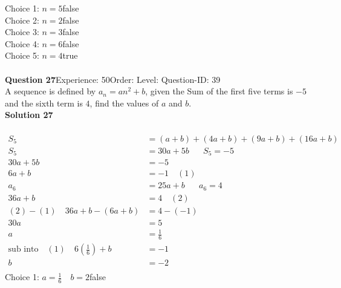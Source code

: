 \documentclass{article}
\begin{document}
Choice 1: \hspace{20pt}$n=5$\hspace{20pt}false\\
Choice 2: \hspace{20pt}$n=2$\hspace{20pt}false\\
Choice 3: \hspace{20pt}$n=3$\hspace{20pt}false\\
Choice 4: \hspace{20pt}$n=6$\hspace{20pt}false\\
Choice 5: \hspace{20pt}$n=4$\hspace{20pt}true\\
\\[4pt]
\noindent\textbf{Question 27}\hspace{20pt}Experience: 50\hspace{20pt}Order: \hspace{20pt}Level: \hspace{20pt}Question-ID: 39\\[2pt]
A sequence is defined by $a_n=an^2+b$, given the Sum of the first five terms is $-5$ and the sixth term is $4$, find the values of $a$ and $b$.\\[4pt]
\noindent\textbf{Solution 27}\\[2pt]
\\[-35pt]\begin{align*}
S_5&=(a+b)+(4a+b)+(9a+b)+(16a+b)\\[2pt]
S_5&=30a+5b\hspace{20pt} S_5=-5\\[2pt]
30a+5b&=-5\\[2pt]
6a+b&=-1\quad (1)\\[12pt]
a_6&=25a+b\hspace{20pt}a_6=4\\[2pt]
36a+b&=4\quad (2)\\[12pt]
(2)-(1)\quad 36a+b-(6a+b)&=4-(-1)\\[2pt]
30a&=5\\[2pt]
a&=\displaystyle\frac{1}{6}\\[12pt]
\text{sub into}\quad (1) \quad 6\left(\displaystyle\frac{1}{6}\right)+b&=-1\\[2pt]
b&=-2\\[2pt]
\end{align*}
Choice 1: \hspace{20pt}$a=\displaystyle\frac{1}{6}\quad b=2$\hspace{20pt}false\\
\end{document}

